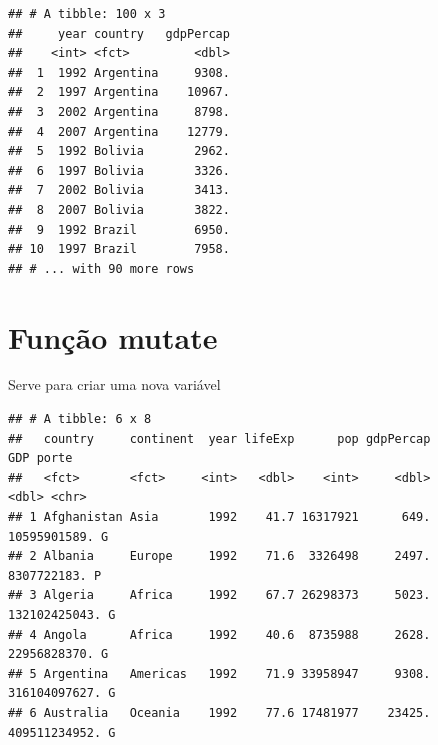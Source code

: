 \documentclass[
]{article}
\newenvironment{Shaded}{\begin{snugshade}}{\end{snugshade}}
\newcommand{\DataTypeTok}[1]{\textcolor[rgb]{0.13,0.29,0.53}{#1}}
\newcommand{\DecValTok}[1]{\textcolor[rgb]{0.00,0.00,0.81}{#1}}
\newcommand{\KeywordTok}[1]{\textcolor[rgb]{0.13,0.29,0.53}{\textbf{#1}}}
\newcommand{\NormalTok}[1]{#1}
\newcommand{\OperatorTok}[1]{\textcolor[rgb]{0.81,0.36,0.00}{\textbf{#1}}}
\newcommand{\StringTok}[1]{\textcolor[rgb]{0.31,0.60,0.02}{#1}}
\begin{document}
\begin{verbatim}
## # A tibble: 100 x 3
##     year country   gdpPercap
##    <int> <fct>         <dbl>
##  1  1992 Argentina     9308.
##  2  1997 Argentina    10967.
##  3  2002 Argentina     8798.
##  4  2007 Argentina    12779.
##  5  1992 Bolivia       2962.
##  6  1997 Bolivia       3326.
##  7  2002 Bolivia       3413.
##  8  2007 Bolivia       3822.
##  9  1992 Brazil        6950.
## 10  1997 Brazil        7958.
## # ... with 90 more rows
\end{verbatim}

\hypertarget{funuxe7uxe3o-mutate}{%
\section{Função mutate}\label{funuxe7uxe3o-mutate}}

Serve para criar uma nova variável

\begin{Shaded}
\end{Shaded}

\begin{verbatim}
## # A tibble: 6 x 8
##   country     continent  year lifeExp      pop gdpPercap           GDP porte
##   <fct>       <fct>     <int>   <dbl>    <int>     <dbl>         <dbl> <chr>
## 1 Afghanistan Asia       1992    41.7 16317921      649.  10595901589. G    
## 2 Albania     Europe     1992    71.6  3326498     2497.   8307722183. P    
## 3 Algeria     Africa     1992    67.7 26298373     5023. 132102425043. G    
## 4 Angola      Africa     1992    40.6  8735988     2628.  22956828370. G    
## 5 Argentina   Americas   1992    71.9 33958947     9308. 316104097627. G    
## 6 Australia   Oceania    1992    77.6 17481977    23425. 409511234952. G
\end{verbatim}
\end{document}
